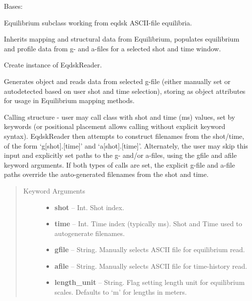 \documentclass[letterpaper,10pt,english]{sphinxmanual}
\begin{document}
\begin{fulllineitems}
\label{eqtools:eqtools.eqdskreader.EqdskReader}
Bases: {\hyperref[eqtools:eqtools.core.Equilibrium]{}}

Equilibrium subclass working from eqdsk ASCII-file equilibria.

Inherits mapping and structural data from Equilibrium, populates equilibrium
and profile data from g- and a-files for a selected shot and time window.

Create instance of EqdskReader.

Generates object and reads data from selected g-file (either manually set or
autodetected based on user shot and time selection), storing as object
attributes for usage in Equilibrium mapping methods.

Calling structure - user may call class with shot and time (ms) values, set by keywords
(or positional placement allows calling without explicit keyword syntax).  EqdskReader
then attempts to construct filenames from the shot/time, of the form `g{[}shot{]}.{[}time{]}' and
`a{[}shot{]}.{[}time{]}'.  Alternately, the user may skip this input and explicitly set paths to
the g- and/or a-files, using the gfile and afile keyword arguments.  If both types of calls
are set, the explicit g-file and a-file paths override the auto-generated filenames from
the shot and time.
\begin{quote}\begin{description}
\item[{Keyword Arguments}] \leavevmode\begin{itemize}
\item {} 
\textbf{shot} --
Int.
Shot index.

\item {} 
\textbf{time} --
Int.
Time index (typically ms).  Shot and Time used to autogenerate filenames.

\item {} 
\textbf{gfile} --
String.
Manually selects ASCII file for equilibrium read.

\item {} 
\textbf{afile} --
String.
Manually selects ASCII file for time-history read.

\item {} 
\textbf{length\_unit} --
String.
Flag setting length unit for equilibrium scales.
Defaults to `m' for lengths in meters.


\end{itemize}
\end{description}
\end{quote}
\end{fulllineitems}
\end{document}
